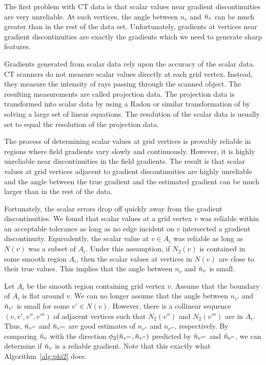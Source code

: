 The first problem with CT data is that scalar values near gradient
discontinuities are very unreliable.
At such vertices,
the angle between $n_v$ and $\tilde{n}_v$ can be much greater 
than in the rest of the data set.
Unfortunately, gradients at vertices near gradient discontinuities 
are exactly the gradients which we need to generate sharp features.

Gradients generated from scalar data rely upon the accuracy
of the scalar data.
CT scanners do not measure scalar values directly at each grid vertex.
Instead, they measure the intensity of rays passing 
through the scanned object.
The resulting measurements are called projection data.
The projection data is transformed into scalar data
by using a Radon or similar transformation
of by solving a large set of linear equations.
The resolution of the scalar data is usually set to equal
the resolution of the projection data.

The process of determining scalar values at grid vertices
is provably reliable in regions where field gradients 
vary slowly and continuously.
However, it is highly unreliable near discontinuities 
in the field gradients.
The result is that scalar values at grid vertices
adjacent to gradient discontinuities are highly unreliable
and the angle between the true gradient and the estimated gradient
can be much larger than in the rest of the data.

Fortunately, the scalar errors drop off quickly away 
from the gradient discontinuities.
We found that scalar values at a grid vertex $v$ was reliable
within an acceptable tolerance as long as no edge incident on $v$
intersected a gradient discontinuity.
Equivalently, the scalar value at $v \in A_i$ was reliable
as long as $N(v)$ was a subset of $A_i$.
Under this assumption,
if $N_2(v)$ is contained in some smooth region $A_i$,
then the scalar values at vertices in $N(v)$ are close to their true values.
This implies that the angle between $n_v$ and $\tilde{n}_v$ is small.

Let $A_i$ be the smooth region containing grid vertex $v$.
Assume that the boundary of $A_i$ is flat around $v$.
We can no longer assume that the angle between $n_{v'}$ and $\tilde{n}_{v'}$
is small for some $v' \in N(v)$.
However, there is a collinear sequence $(v,v',v'',v''')$ 
of adjacent vertices such that $N_2(v'')$ and $N_2(v''')$ 
are in $A_i$.
Thus, $\tilde{n}_{v''}$ and $\tilde{n}_{v'''}$ are good estimates
of $n_{v''}$ and $n_{v'''}$, respectively.
By comparing $\tilde{n}_v$ with the direction $\phi_2(\tilde{n}_{v'''},\tilde{n}_{v''})$
predicted by $\tilde{n}_{v'''}$ and $\tilde{n}_{v''}$,
we can determine if $\tilde{n}_v$ is a reliable gradient.
Note that this exactly what Algorithm~\ref{alg:phi2} does.


